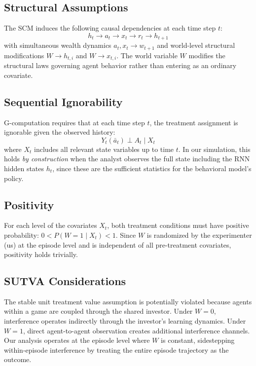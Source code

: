 \documentclass[
]{article}
\begin{document}
\subsection{Structural Assumptions}\label{structural-assumptions}

The SCM induces the following causal dependencies at each time step
\(t\):
\[h_t \rightarrow a_t \rightarrow x_t \rightarrow r_t \rightarrow h_{t+1}\]
with simultaneous wealth dynamics \(a_t, x_t \rightarrow w_{t+1}\) and
world-level structural modifications \(W \rightarrow h_{t,i}\) and
\(W \rightarrow x_{t,i}\). The world variable \(W\) modifies the
structural laws governing agent behavior rather than entering as an
ordinary covariate.

\subsection{Sequential Ignorability}\label{sequential-ignorability}

G-computation requires that at each time step \(t\), the treatment
assignment is ignorable given the observed history:
\[Y_t(\bar{a}_t) \perp A_t \mid X_t\] where \(X_t\) includes all
relevant state variables up to time \(t\). In our simulation, this holds
\emph{by construction} when the analyst observes the full state
including the RNN hidden states \(h_t\), since these are the sufficient
statistics for the behavioral model's policy.

\subsection{Positivity}\label{positivity}

For each level of the covariates \(X_t\), both treatment conditions must
have positive probability: \(0 < P(W = 1 \mid X_t) < 1\). Since \(W\) is
randomized by the experimenter (us) at the episode level and is
independent of all pre-treatment covariates, positivity holds trivially.

\subsection{SUTVA Considerations}\label{sutva-considerations}

The stable unit treatment value assumption is potentially violated
because agents within a game are coupled through the shared investor.
Under \(W = 0\), interference operates indirectly through the investor's
learning dynamics. Under \(W = 1\), direct agent-to-agent observation
creates additional interference channels. Our analysis operates at the
episode level where \(W\) is constant, sidestepping within-episode
interference by treating the entire episode trajectory as the outcome.
\end{document}
